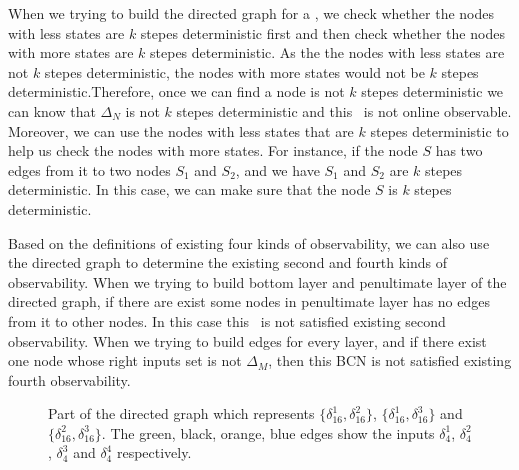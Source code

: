 When we trying to build the directed graph for a {\BCN}, we check whether the nodes with less states are $k$ stepes deterministic first and then check whether the nodes with more states are $k$ stepes deterministic.  As the the nodes with less states are not $k$ stepes deterministic, the nodes with more states would not be $k$ stepes deterministic.Therefore, once we can find a node is not $k$ stepes deterministic we can know that $\Delta_N$ is not $k$ stepes deterministic and this \BCN\ is not online observable. Moreover, we can use the nodes with less states that are $k$ stepes deterministic to help us check the nodes with more states. For instance, if the node $S$ has two edges from it to two nodes $S_1$ and $S_2$, and we have $S_1$ and $S_2$ are $k$ stepes deterministic. In this case, we can make sure that the node $S$ is $k$ stepes deterministic.

Based on the definitions of existing four kinds of observability, we can also use the directed graph to determine the existing second and fourth kinds of observability. When we trying to build bottom layer and penultimate layer of the directed graph, if there are exist some nodes in penultimate layer has no edges from it to other nodes. In this case this \BCN\ is not satisfied existing second observability. When we trying to build edges for every layer, and if there exist one node whose right inputs set is not $\Delta_M$, then this BCN is not satisfied existing fourth observability.
\begin{figure}[thpb]
      \centering
      
      \caption{Part of the directed graph which represents $\{\delta_{16}^1,\delta_{16}^2\}$, $\{\delta_{16}^1,\delta_{16}^3\}$ and $\{\delta_{16}^2,\delta_{16}^3\}$. The green, black, orange, blue edges show the inputs $\delta_4^1$, $\delta_4^2$, $\delta_4^3$ and $\delta_4^4$ respectively.}
      \label{fig:4}
   \end{figure}
